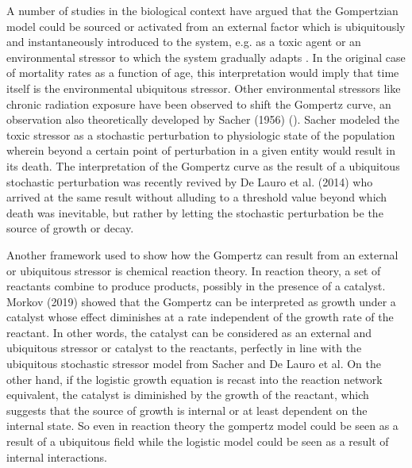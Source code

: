 \documentclass{article}
\begin{document}
A number of studies in the biological context have argued that the Gompertzian model could be sourced or activated from an external factor which is ubiquitously and instantaneously introduced to the system, e.g. as a toxic agent or an environmental stressor to which the system gradually adapts \cite{neafsey1988gompertz,neafsey1989gompertz,thompson1990biphasic}. In the original case of mortality rates as a function of age, this interpretation would imply that time itself is the environmental ubiquitous stressor. Other environmental stressors like chronic radiation exposure have been observed to shift the Gompertz curve, an observation also theoretically developed by Sacher (1956) (\cite{sacher1956statistical}). Sacher modeled the toxic stressor as a stochastic perturbation to physiologic state of the population wherein beyond a certain point of perturbation in a given entity would result in its death. The interpretation of the Gompertz curve as the result of a ubiquitous stochastic perturbation was recently revived by De Lauro et al. (2014) \cite{de2014stochastic} who arrived at the same result without alluding to a threshold value beyond which death was inevitable, but rather by letting the stochastic perturbation be the source of growth or decay.

Another framework used to show how the Gompertz can result from an external or ubiquitous stressor is chemical reaction theory. In reaction theory, a set of reactants combine to produce products, possibly in the presence of a catalyst. Morkov (2019) \cite{markov2019reaction} showed that the Gompertz can be interpreted as growth under a catalyst whose effect diminishes at a rate independent of the growth rate of the reactant. In other words, the catalyst can be considered as an external and ubiquitous stressor or catalyst to the reactants, perfectly in line with the ubiquitous stochastic stressor model from Sacher and De Lauro et al. On the other hand, if the logistic growth equation is recast into the reaction network equivalent, the catalyst is diminished by the growth of the reactant, which suggests that the source of growth is internal or at least dependent on the internal state. So even in reaction theory the gompertz model could be seen as a result of a ubiquitous field while the logistic model could be seen as a result of internal interactions. 
\end{document}
